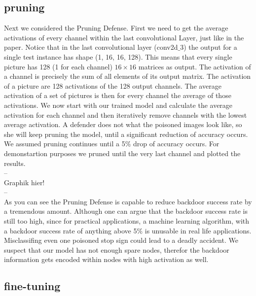 \documentclass[a4paper,12pt]{report}
\begin{document}
\subsection{pruning}
Next we considered the Pruning Defense. First we need to get the average activations of every channel within the last convolutional Layer, just like in the paper. Notice that in the last convolutional layer (conv2d$\_$3) the output for a single test instance has shape (1, 16, 16, 128). This means that every single picture has 128 (1 for each channel) $16 \times 16$ matrices as output. The activation of a channel is precisely the sum of all elements of its output matrix. The activation of a picture are 128 activations of the 128 output channels. The average activation of a set of pictures is then for every channel the average of those activations. We now start with our trained model and calculate the average activation for each channel and then iteratively remove channels with the lowest average activation. A defender does not what the poisoned images look like, so she will keep pruning the model, until a significant reduction of accuracy occurs. We assumed pruning continues until a 5$\%$ drop of accuracy occurs. For demonstartion purposes we pruned until the very last channel and plotted the results.
\\
--\\
Graphik hier!\\
--\\
As you can see the Pruning Defense is capable to reduce backdoor success rate by a tremendous amount. Although one can argue that the backdoor success rate is still too high, since for practical applications, a machine learning algorithm, with a backdoor success rate of anything above 5$\%$ is unusable in real life applications. Misclassifing even one poisoned stop sign could lead to a deadly accident. We suspect that our model has not enough spare nodes, therefor the backdoor information gets encoded within nodes with high activation as well. 
\subsection{fine-tuning}
\end{document}
